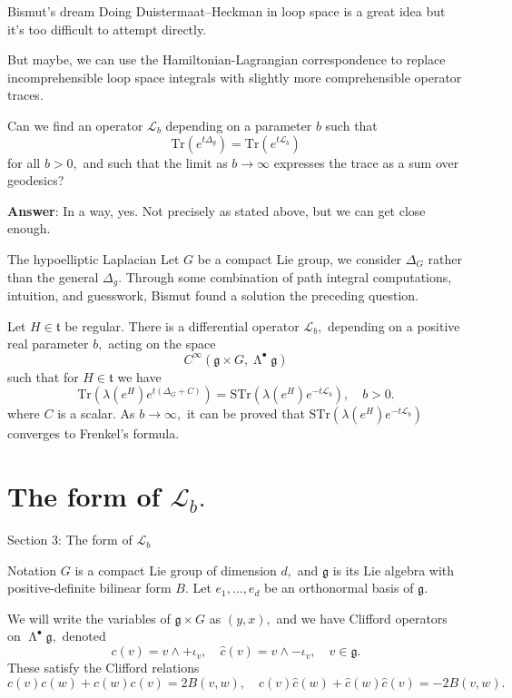 \documentclass{beamer}
\numberwithin{equation}{section}
\theoremstyle{plain}
\theoremstyle{plain}
\theoremstyle{definition}
\theoremstyle{plain}
\theoremstyle{plain}
\theoremstyle{definition}
\newcommand{\Lc}{\mathcal{L}}
\newcommand{\Tr}{\mathrm{Tr}}
\newcommand{\gf}{\mathfrak{g}}
\newcommand{\tf}{\mathfrak{t}}
\newcommand{\Str}{\mathrm{STr}}
\DeclareMathOperator{\Ext}{\mathsf{\Lambda}}
\begin{document}
\begin{frame}{Bismut's dream}
  Doing Duistermaat--Heckman in loop space is a great idea but it's too difficult to attempt directly.
  
  But maybe, we can use the Hamiltonian-Lagrangian correspondence to replace incomprehensible loop space integrals with slightly more comprehensible operator traces.
  \begin{center}
    Can we find an operator $\Lc_b$ depending on a parameter $b$ such that
    \[
      \Tr(e^{t\Delta_g}) = \Tr(e^{t\Lc_b})
    \]
    for all $b>0,$ and such that the limit as $b\to\infty$ expresses the trace as a sum over geodesics?
  \end{center}
  \textbf{Answer}: In a way, yes. Not precisely as stated above, but we can get close enough.
\end{frame}

\begin{frame}{The hypoelliptic Laplacian}
  Let $G$ be a compact Lie group, we consider $\Delta_G$ rather than the general $\Delta_g.$ Through some combination of path integral computations, intuition, and guesswork, Bismut found a solution the preceding question.
  \begin{theorem}[Bismut (2011)]
    Let $H\in \tf$ be regular. There is a differential operator $\Lc_{b},$ depending on a positive real parameter $b,$ acting on the space
    \[
      C^\infty(\gf\times G,\Ext^\bullet\gf)
    \]
    such that for $H \in \tf$ we have
    \[
       \Tr(\lambda(e^H)e^{t(\Delta_G+C)}) = \Str(\lambda(e^H)e^{-t\Lc_{b}}),\quad b>0.
    \]
    where $C$ is a scalar.
    As $b\to\infty,$ it can be proved that $\Str(\lambda(e^H)e^{-t\Lc_{b}})$ converges to Frenkel's formula.
  \end{theorem}
\end{frame}

\section{The form of $\Lc_b.$}

\begin{frame}
  \huge{Section 3: The form of $\Lc_b$}
\end{frame}

\begin{frame}{Notation}
  $G$ is a compact Lie group of dimension $d,$ and $\gf$ is its Lie algebra with positive-definite bilinear form $B$. Let $e_1,\ldots,e_d$ be an orthonormal basis of $\gf.$
  
  We will write the variables of $\gf\times G$ as $(y,x),$ and we have Clifford operators on $\Ext^{\bullet}\gf,$ denoted
  \[
    c(v) = v\wedge + \iota_v,\quad \widehat{c}(v) = v\wedge -\iota_v,\quad v \in \gf.
  \]
  These satisfy the Clifford relations
  \[
    c(v)c(w)+c(w)c(v) = 2B(v,w),\quad \widehat{c}(v)\widehat{c}(w)+\widehat{c}(w)\widehat{c}(v) = -2B(v,w).
  \]
\end{frame}
\end{document}
